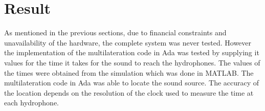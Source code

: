\section{Result}\label{sec:result}
As mentioned in the previous sections, due to financial constraints and unavailability of the hardware, the complete system was never tested. However the implementation of the multilateration code in Ada was tested by supplying it values for the time it takes for the sound to reach the hydrophones. The values of the times were obtained from the simulation which was done in MATLAB. The multilateration code in Ada was able to locate the sound source. The accuracy of the location depends on the resolution of the clock used to measure the time at each hydrophone.


